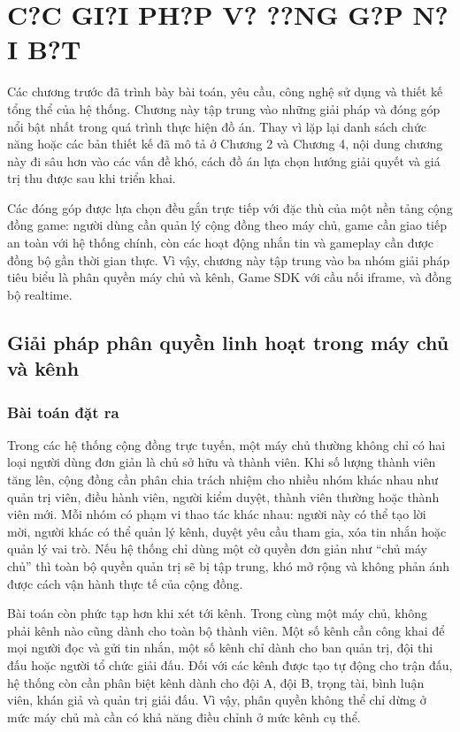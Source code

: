 \chapter{C?C GI?I PH?P V? ??NG G?P N?I B?T}
\label{chapter:5}

Các chương trước đã trình bày bài toán, yêu cầu, công nghệ sử dụng và thiết kế tổng thể của hệ thống. Chương này tập trung vào những giải pháp và đóng góp nổi bật nhất trong quá trình thực hiện đồ án. Thay vì lặp lại danh sách chức năng hoặc các bản thiết kế đã mô tả ở Chương 2 và Chương 4, nội dung chương này đi sâu hơn vào các vấn đề khó, cách đồ án lựa chọn hướng giải quyết và giá trị thu được sau khi triển khai.

Các đóng góp được lựa chọn đều gắn trực tiếp với đặc thù của một nền tảng cộng đồng game: người dùng cần quản lý cộng đồng theo máy chủ, game cần giao tiếp an toàn với hệ thống chính, còn các hoạt động nhắn tin và gameplay cần được đồng bộ gần thời gian thực. Vì vậy, chương này tập trung vào ba nhóm giải pháp tiêu biểu là phân quyền máy chủ và kênh, Game SDK với cầu nối iframe, và đồng bộ realtime.

\section{Giải pháp phân quyền linh hoạt trong máy chủ và kênh}
\label{section:5.1}

\subsection{Bài toán đặt ra}
\label{subsection:5.1.1}

Trong các hệ thống cộng đồng trực tuyến, một máy chủ thường không chỉ có hai loại người dùng đơn giản là chủ sở hữu và thành viên. Khi số lượng thành viên tăng lên, cộng đồng cần phân chia trách nhiệm cho nhiều nhóm khác nhau như quản trị viên, điều hành viên, người kiểm duyệt, thành viên thường hoặc thành viên mới. Mỗi nhóm có phạm vi thao tác khác nhau: người này có thể tạo lời mời, người khác có thể quản lý kênh, duyệt yêu cầu tham gia, xóa tin nhắn hoặc quản lý vai trò. Nếu hệ thống chỉ dùng một cờ quyền đơn giản như “chủ máy chủ” thì toàn bộ quyền quản trị sẽ bị tập trung, khó mở rộng và không phản ánh được cách vận hành thực tế của cộng đồng.

Bài toán còn phức tạp hơn khi xét tới kênh. Trong cùng một máy chủ, không phải kênh nào cũng dành cho toàn bộ thành viên. Một số kênh cần công khai để mọi người đọc và gửi tin nhắn, một số kênh chỉ dành cho ban quản trị, đội thi đấu hoặc người tổ chức giải đấu. Đối với các kênh được tạo tự động cho trận đấu, hệ thống còn cần phân biệt kênh dành cho đội A, đội B, trọng tài, bình luận viên, khán giả và quản trị giải đấu. Vì vậy, phân quyền không thể chỉ dừng ở mức máy chủ mà cần có khả năng điều chỉnh ở mức kênh cụ thể.

